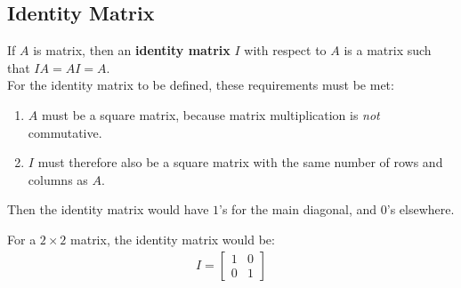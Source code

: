 \documentclass[../notes.tex]{subfiles}
\begin{document}
			\subsection{Identity Matrix}
				If $A$ is matrix, then an \textbf{identity matrix} $I$ with respect to $A$ is a matrix such that $IA = AI = A$.\\
				For the identity matrix to be defined, these requirements must be met:
				\begin{enumerate}
					\item $A$ must be a square matrix, because matrix multiplication is \textit{not} commutative.
					\item $I$ must therefore also be a square matrix with the same number of rows and columns as $A$.
				\end{enumerate}
				Then the identity matrix would have $1$'s for the main diagonal, and $0$'s elsewhere.
				\begin{example}
					For a $2 \times 2$ matrix, the identity matrix would be:
						\begin{align*}
							I = \begin{bmatrix}
								1 & 0\\
								0 & 1
							\end{bmatrix}
						\end{align*}
				\end{example}
\end{document}
